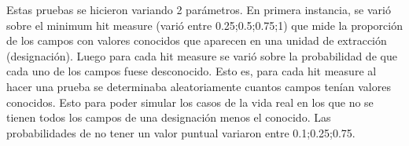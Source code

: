Estas pruebas se hicieron variando 2 parámetros. En primera instancia, se varió sobre el minimum hit measure (varió entre 0.25;0.5;0.75;1) que mide la proporción de los campos con valores conocidos que aparecen en una unidad de extracción (designación). Luego para cada hit measure se varió sobre la probabilidad de que cada uno de los campos fuese desconocido. Esto es, para cada hit measure al hacer una prueba se determinaba aleatoriamente cuantos campos tenían valores conocidos. Esto para poder simular los casos de la vida real en los que no se tienen todos los campos de una designación menos el conocido. Las probabilidades de no tener un valor puntual variaron entre 0.1;0.25;0.75. 

